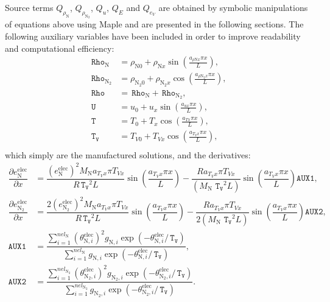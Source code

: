\documentclass[10pt]{article}
\newcommand{\diff}[2] {\dfrac{\partial #1 }{\partial #2}}
\newcommand{\Rho}{\,\mathtt{Rho}}
\newcommand{\T}{\,\mathtt{T}}
\newcommand{\U}{\,\mathtt{U}}
\newcommand{\TV}{\,\mathtt{T_V}}
\newcommand{\N}{\text{N}}
\newcommand{\elec}{\text{elec}}
\begin{document}
Source terms $ Q_{\rho_{\text{N}}}$, $ Q_{\rho_{\text{N}_2}}$, $Q_u$,  $Q_{E}$ and $Q_{e_V}$ are obtained by symbolic manipulations of equations above using Maple and are presented in the following sections. The following auxiliary variables have been included in order to improve readability and computational efficiency:
\begin{equation}
 \begin{split}
\label{eq:aux_1d}
\Rho_{\text{N}} &= \rho_{\text{N}0} + \rho_{\text{N}x} \sin\left(\frac{a_{  \rho \text{N} x }\pi x}{L}\right),\\
\Rho_{\text{N}_2} &= \rho_{\text{N}_2 0}+ \rho_{\text{N}_2 x} \cos\left(\frac{a_{ \rho \text{N}_2 x } \pi x}{L}\right),\\
\Rho&=\Rho_{\text{N}}+\Rho_{\text{N}_2},\\
\U &= u_{0}+u_{x} \sin\left(\frac{a_{u x} \pi x}{L}\right),\\
\T &= T_{0}+T_{x} \cos\left(\frac{a_{T x} \pi x}{L}\right),\\
\TV &= T_{V0}+T_{Vx} \cos\left(\frac{a_{T_V x} \pi x}{L}\right),\\
\end{split}
\end{equation}
which simply are the manufactured solutions, and the derivatives:
\begin{equation}
\begin{split}\label{eq:aux_01}
\diff{e_{\N}^{\elec}}{x} &= \dfrac{(e_{\N}^{\elec})^2 M_\N a_{T_V x} \pi T_{Vx} }{R \TV^2 L}\sin\left(\dfrac{a_{T_V x} \pi x}{L}\right) - \dfrac{R  a_{T_V x} \pi T_{Vx}  }{(M_\N \,  \TV^2 L)}\sin\left(\dfrac{a_{T_V x} \pi x}{L}\right)\mathtt{AUX1},	\\
%
\diff{e_{\N_2}^{\elec}}{x} &= \dfrac{2 (e_{\N_2}^{\elec})^2 M_\N a_{T_V x} \pi T_{Vx} }{R \TV^2 L}\sin\left(\dfrac{a_{T_V x} \pi x}{L}\right)- \dfrac{R  a_{T_V x} \pi T_{Vx}  }{2(M_\N \,  \TV^2 L)}\sin\left(\dfrac{a_{T_V x} \pi x}{L}\right)\mathtt{AUX2},	\\
%
\texttt{AUX1} &= \dfrac{\sum_{i=1}^{nel_{\N}}( \theta^{\elec}_{\N,i})^2 g_{\N,i} \exp\left(- \theta^{\elec}_{\N,i}/ \TV \right)} { \sum_{i=1}^{nel_{\N}} g_{\N,i} \exp\left(-\theta^{\elec}_{\N,i}/\TV\right)},	\\
%
\texttt{AUX2} &= \dfrac{\sum_{i=1}^{nel_{\N_2}}( \theta^{\elec}_{\N_2,i})^2 g_{\N_2,i} \exp\left(- \theta^{\elec}_{\N_2,i} / \TV \right)} {\sum_{i=1}^{nel_{\N_2}} g_{\N_2,i} \exp\left(-\theta^{\elec}_{\N_2,i}/\TV\right)}.
%	
\end{split}
\end{equation}
\end{document}
